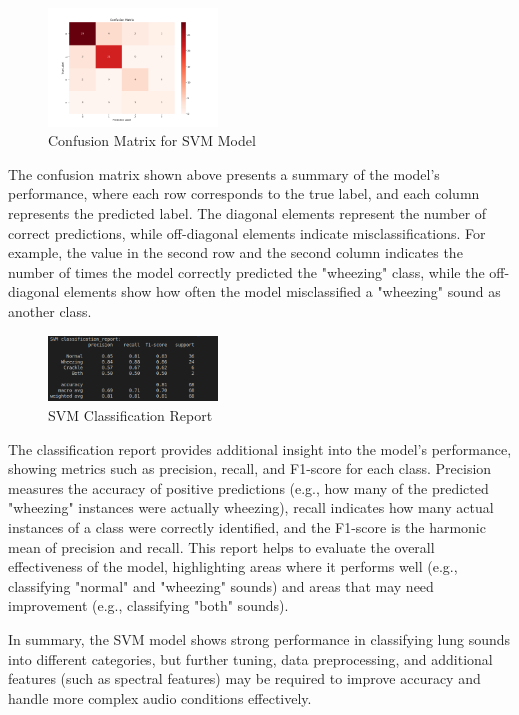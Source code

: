 \documentclass[conference]{IEEEtran}
\begin{document}
\begin{figure}[h!]
    \centering
    \includegraphics[width=0.4\textwidth]{Images/confusion_matrix.jpeg}
    \caption{Confusion Matrix for SVM Model}
\end{figure}

The confusion matrix shown above presents a summary of the model's performance, where each row corresponds to the true label, and each column represents the predicted label. The diagonal elements represent the number of correct predictions, while off-diagonal elements indicate misclassifications. For example, the value in the second row and the second column indicates the number of times the model correctly predicted the "wheezing" class, while the off-diagonal elements show how often the model misclassified a "wheezing" sound as another class.

\begin{figure}[h!]
    \centering
    \includegraphics[width=0.4\textwidth]{Images/SVM.png}
    \caption{SVM Classification Report}
\end{figure}

The classification report provides additional insight into the model's performance, showing metrics such as precision, recall, and F1-score for each class. Precision measures the accuracy of positive predictions (e.g., how many of the predicted "wheezing" instances were actually wheezing), recall indicates how many actual instances of a class were correctly identified, and the F1-score is the harmonic mean of precision and recall. This report helps to evaluate the overall effectiveness of the model, highlighting areas where it performs well (e.g., classifying "normal" and "wheezing" sounds) and areas that may need improvement (e.g., classifying "both" sounds).

In summary, the SVM model shows strong performance in classifying lung sounds into different categories, but further tuning, data preprocessing, and additional features (such as spectral features) may be required to improve accuracy and handle more complex audio conditions effectively.
\end{document}
